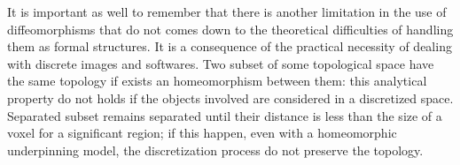 It is important as well to remember that there is another limitation in the use of diffeomorphisms that do not comes down to the theoretical difficulties of handling them as formal structures. It is a consequence of the practical necessity of dealing with discrete images and softwares. Two subset of some topological space have the same topology if exists an homeomorphism between them: this analytical property do not holds if the objects involved are considered in a discretized space. Separated subset remains separated until their distance is less than the size of a voxel for a significant region; if this happen, even with a homeomorphic underpinning model, the discretization process do not preserve the topology.\\



